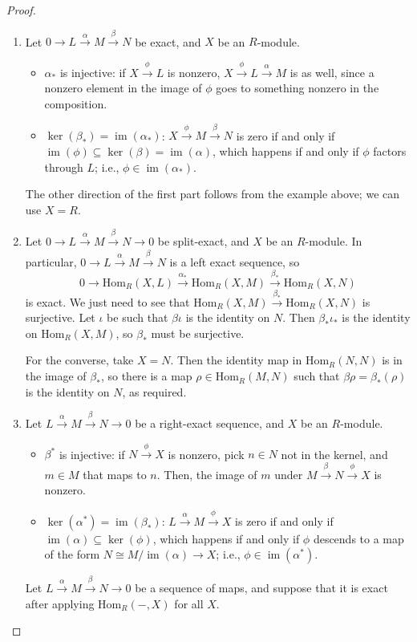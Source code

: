 \documentclass{amsart}[12pt]
\def\image{\operatorname{im}}
\def\im{\image}
\def\ker{\operatorname{ker}}
\newcommand{\Hom}{\mathrm{Hom}}
\numberwithin{equation}{section}
\theoremstyle{plain} %
\theoremstyle{definition}
\theoremstyle{remark}
\begin{document}
\begin{proof}
\begin{enumerate}
\item
 Let $0 \to L \xrightarrow{\alpha} M \xrightarrow{\beta} N$ be exact, and $X$ be an $R$-module. 
 \begin{itemize}
 \item $\alpha_*$ is injective: if $X \xrightarrow{\phi} L$ is nonzero, $X \xrightarrow{\phi} L \xrightarrow{\alpha} M$ is as well, since a nonzero element in the image of $\phi$ goes to something nonzero in the composition.
\item $\ker(\beta_*)=\im(\alpha_*)$: $X \xrightarrow{\phi} M \xrightarrow{\beta} N$ is zero if and only if $\im(\phi) \subseteq \ker(\beta) = \im(\alpha)$, which happens if and only if $\phi$ factors through $L$; i.e., $\phi\in \im(\alpha_*)$.
\end{itemize}

  The other direction of the first part follows from the example above; we can use $X=R$.

\item Let $0 \to L \xrightarrow{\alpha} M \xrightarrow{\beta} N \to 0$ be split-exact, and $X$ be an $R$-module. In particular, $0 \to L \xrightarrow{\alpha} M \xrightarrow{\beta} N$ is a left exact sequence, so 
\[ 0 \to \Hom_R(X,L) \xrightarrow{\alpha_*} \Hom_R(X,M) \xrightarrow{\beta_*} \Hom_R(X,N)  \]
		is exact. We just need to see that $\Hom_R(X,M) \xrightarrow{\beta_*} \Hom_R(X,N) $ is surjective. Let $\iota$ be such that $\beta\iota$ is the identity on $N$. Then $\beta_*\iota_*$ is the identity on $\Hom_R(X,M)$, so $\beta_*$ must be surjective.
		
		For the converse, take $X=N$. Then the identity map in $\Hom_R(N,N)$ is in the image of $\beta_*$, so there is a map $\rho\in \Hom_R(M,N)$ such that $\beta \rho =\beta_*(\rho)$ is the identity on $N$, as required.
 
\item  Let $L \xrightarrow{\alpha} M \xrightarrow{\beta} N \to 0$ be a right-exact sequence, and $X$ be an $R$-module.
  \begin{itemize}
\item   $\beta^*$ is injective: if $N \xrightarrow{\phi} X$ is nonzero, pick $n\in N$ not in the kernel, and $m\in M$ that maps to $n$. Then, the image of $m$ under $ M \xrightarrow{\beta} N \xrightarrow{\phi} X$ is nonzero.
 \item $\ker(\alpha^*)=\im(\beta_*)$: $ L \xrightarrow{\alpha} M \xrightarrow{\phi} X$ is zero if and only if $\im(\alpha)\subseteq \ker(\phi)$, which happens if and only if $\phi$ descends to a map of the form $N \cong M/\im(\alpha) \to X$; i.e., $\phi \in \im(\alpha^*)$.
\end{itemize}
 Let $L \xrightarrow{\alpha} M \xrightarrow{\beta} N \to 0$ be a sequence of maps, and suppose that it is exact after applying $\Hom_R(-,X)$ for all $X$.
  

\end{enumerate}
\end{proof}
\end{document}

